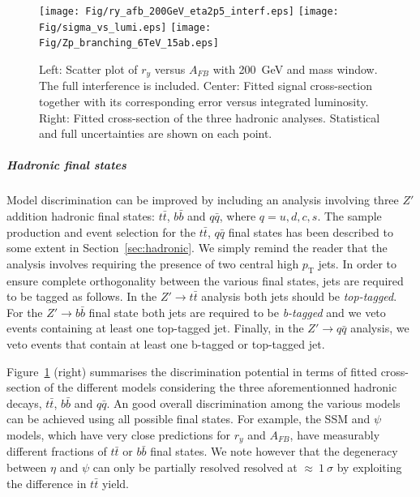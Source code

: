 \documentclass[a4paper,11pt]{article}
\newcommand{\pt}{\ensuremath{p_{\text{T}}}}
\begin{document}
\begin{figure}[!htb]
  \centering
   \texttt{[image: Fig/ry\_afb\_200GeV\_eta2p5\_interf.eps]}
   \texttt{[image: Fig/sigma\_vs\_lumi.eps]}
   \texttt{[image: Fig/Zp\_branching\_6TeV\_15ab.eps]}
  \caption{Left: Scatter plot of $r_y$ versus $A_{FB}$ with 200~GeV and mass window. The full interference is included. Center: Fitted signal cross-section together with its corresponding error versus integrated luminosity. Right: Fitted cross-section of the three hadronic analyses. Statistical and full uncertainties are shown on each point.}
  \label{fig:ana:res}
\end{figure}

\subparagraph*{Hadronic final states}
\label{par:hadana}

Model discrimination can be improved by including an analysis involving three $Z'$ addition hadronic final states: $t\bar{t}$, $b\bar{b}$ and $q\bar{q}$, where $q=u,d,c,s$. The sample production and event selection for the $t\bar{t}$, $q\bar{q}$ final states has been described to some extent in Section~\ref{sec:hadronic}. We simply remind the reader that the analysis involves requiring the presence of two central high $\pt$ jets. In order to ensure complete orthogonality between the various final states, jets are required to be tagged as follows. In the $Z' \rightarrow t\bar{t}$ analysis both jets should be \emph{top-tagged}. For the $Z' \rightarrow b\bar{b}$ final state both jets are required to be \emph{b-tagged} and we veto events containing at least one top-tagged jet. Finally, in the $Z' \rightarrow q\bar{q}$ analysis, we veto events that contain at least one b-tagged or top-tagged jet.

Figure~\ref{fig:ana:res} (right) summarises the discrimination potential in terms of fitted cross-section of the different models considering the three aforementionned hadronic decays, $t\bar{t}$,  $b\bar{b}$ and $q\bar{q}$. An good overall discrimination among the various models can be achieved using all possible final states. For example, the SSM and $\psi$ models, which have very close predictions for $r_y$ and $A_{FB}$, have measurably different fractions of $t\bar{t}$ or $b\bar{b}$ final states. We note however that the degeneracy between $\eta$ and $\psi$ can only be partially resolved resolved at $\approx~1~\sigma$ by exploiting the difference in $t\bar{t}$ yield.
\end{document}
